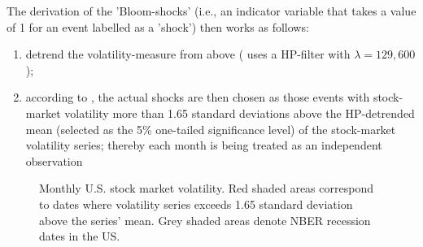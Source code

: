 \documentclass[a4paper,12pt,oneside,pointednumbers,bibtotoc,bigheadings,liststotoc]{scrbook}
\begin{document}
The derivation of the 'Bloom-shocks' (i.e., an indicator variable that takes a value of 1 for an event labelled as a 'shock') then works as follows:
\begin{enumerate}[i]
	\item detrend the volatility-measure from above (\citet{bloom:09} uses a HP-filter with $\lambda = 129,600$); 
	\item according to \citet{bloom:09}, the actual shocks are then chosen as those events with stock-market volatility more than 1.65 standard deviations above the HP-detrended mean (selected as the 5\% one-tailed significance level) of the stock-market volatility series; thereby each month is being treated as an independent observation
\end{enumerate}

\begin{figure}[!h]
   \centering
   \setlength\fboxsep{0pt}
   \setlength\fboxrule{0pt}
      \caption[Monthly U.S. stock market volatility including Bloom-shocks and NBER recession dates.]{Monthly U.S. stock market volatility. Red shaded areas correspond to dates where volatility series exceeds 1.65 standard deviation above the series' mean. Grey shaded areas denote NBER recession dates in the US.}   \label{fig:volatility_cycle_shocks2}
\end{figure}
\end{document}
